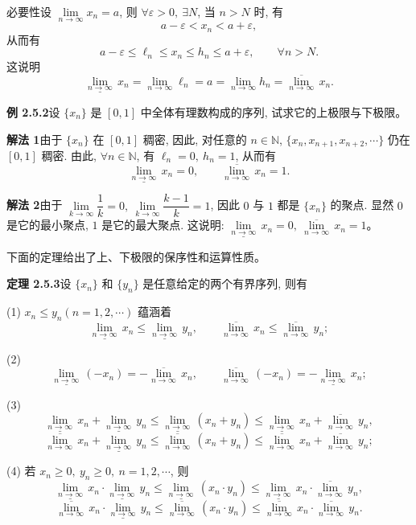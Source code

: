 \documentclass[UTF8,12pt,a4paper,fontset=fandol]{ctexart}
\begin{document}
必要性\quad 设 $\lim\limits_{n\to\infty}x_n=a$, 则 $\forall\varepsilon>0,\ \exists N$, 当 $n>N$ 时, 有
\[
  a-\varepsilon<x_n<a+\varepsilon,
\]
从而有
\[
  a-\varepsilon\leqslant\ell_n\leqslant x_n\leqslant h_n\leqslant a+\varepsilon,\qquad \forall n>N.
\]
这说明
\[
  \underline{\lim_{n\to\infty}}\,x_n
  =
  \lim_{n\to\infty}\ell_n
  =
  a
  =
  \lim_{n\to\infty}h_n
  =
  \overline{\lim_{n\to\infty}}\,x_n.
\]

\noindent\textbf{例 2.5.2}\quad 设 $\{x_n\}$ 是 $[0,1]$ 中全体有理数构成的序列, 试求它的上极限与下极限。

\noindent\textbf{解法 1}\quad 由于 $\{x_n\}$ 在 $[0,1]$ 稠密, 因此, 对任意的 $n\in\mathbb{N}$, $\{x_n,x_{n+1},x_{n+2},\cdots\}$ 仍在 $[0,1]$ 稠密. 由此, $\forall n\in\mathbb{N}$, 有 $\ell_n=0,\ h_n=1$, 从而有
\[
  \underline{\lim_{n\to\infty}}\,x_n=0,
  \qquad
  \overline{\lim_{n\to\infty}}\,x_n=1.
\]

\noindent\textbf{解法 2}\quad 由于 $\lim\limits_{k\to\infty}\dfrac1k=0,\ \lim\limits_{k\to\infty}\dfrac{k-1}{k}=1$, 因此 $0$ 与 $1$ 都是 $\{x_n\}$ 的聚点. 显然 $0$ 是它的最小聚点, $1$ 是它的最大聚点. 这说明: $\underline{\lim\limits_{n\to\infty}}\,x_n=0,\ \overline{\lim\limits_{n\to\infty}}\,x_n=1$。

下面的定理给出了上、下极限的保序性和运算性质。

\noindent\textbf{定理 2.5.3}\quad 设 $\{x_n\}$ 和 $\{y_n\}$ 是任意给定的两个有界序列, 则有

(1) $x_n\leqslant y_n(n=1,2,\cdots)$ 蕴涵着
\[
  \underline{\lim_{n\to\infty}}\,x_n
  \leqslant
  \underline{\lim_{n\to\infty}}\,y_n,
  \qquad
  \overline{\lim_{n\to\infty}}\,x_n
  \leqslant
  \overline{\lim_{n\to\infty}}\,y_n;
\]

(2)
\[
  \underline{\lim_{n\to\infty}}\,(-x_n)
  =
  -\overline{\lim_{n\to\infty}}\,x_n,
  \qquad
  \overline{\lim_{n\to\infty}}\,(-x_n)
  =
  -\underline{\lim_{n\to\infty}}\,x_n;
\]

(3)
\[
  \underline{\lim_{n\to\infty}}\,x_n
  +
  \underline{\lim_{n\to\infty}}\,y_n
  \leqslant
  \underline{\lim_{n\to\infty}}\,(x_n+y_n)
  \leqslant
  \underline{\lim_{n\to\infty}}\,x_n
  +
  \overline{\lim_{n\to\infty}}\,y_n,
\]
\[
  \overline{\lim_{n\to\infty}}\,x_n
  +
  \underline{\lim_{n\to\infty}}\,y_n
  \leqslant
  \overline{\lim_{n\to\infty}}\,(x_n+y_n)
  \leqslant
  \overline{\lim_{n\to\infty}}\,x_n
  +
  \overline{\lim_{n\to\infty}}\,y_n;
\]

(4) 若 $x_n\geqslant0,\ y_n\geqslant0,\ n=1,2,\cdots$, 则
\[
  \underline{\lim_{n\to\infty}}\,x_n\cdot
  \underline{\lim_{n\to\infty}}\,y_n
  \leqslant
  \underline{\lim_{n\to\infty}}\,(x_n\cdot y_n)
  \leqslant
  \underline{\lim_{n\to\infty}}\,x_n\cdot
  \overline{\lim_{n\to\infty}}\,y_n,
\]
\[
  \overline{\lim_{n\to\infty}}\,x_n\cdot
  \underline{\lim_{n\to\infty}}\,y_n
  \leqslant
  \overline{\lim_{n\to\infty}}\,(x_n\cdot y_n)
  \leqslant
  \overline{\lim_{n\to\infty}}\,x_n\cdot
  \overline{\lim_{n\to\infty}}\,y_n.
\]
\end{document}
